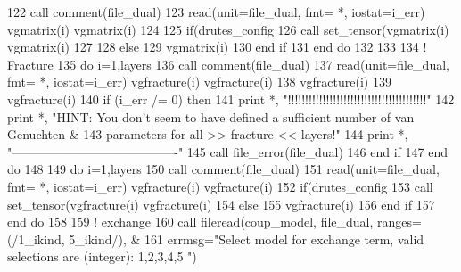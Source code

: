 \begin{DoxyCode}
122         \textcolor{keyword}{call }comment(file\_dual)
123         \textcolor{keyword}{read}(unit=file\_dual, fmt= *, iostat=i\_err) vgmatrix(i)%
      vgmatrix(i)%
124         
125         \textcolor{keywordflow}{if}(drutes_config%
126             \textcolor{keyword}{call }set_tensor(vgmatrix(i)%
      vgmatrix(i)%
127                  
128         \textcolor{keywordflow}{else}
129             vgmatrix(i)%
130 \textcolor{keywordflow}{        end if}    
131 \textcolor{keywordflow}{      end do}
132 
133 
134       \textcolor{comment}{! Fracture}
135       \textcolor{keywordflow}{do} i=1,layers
136         \textcolor{keyword}{call }comment(file\_dual)
137         \textcolor{keyword}{read}(unit=file\_dual, fmt= *, iostat=i\_err) vgfracture(i)%
      vgfracture(i)%
138                             vgfracture(i)%
139         vgfracture(i)%
140         \textcolor{keywordflow}{if} (i\_err /= 0) \textcolor{keywordflow}{then}
141           print *, \textcolor{stringliteral}{"!!!!!!!!!!!!!!!!!!!!!!!!!!!!!!!!!!!!!!!!"}
142           print *, \textcolor{stringliteral}{"HINT: You don't seem to have defined a sufficient number of van Genuchten &}
143 \textcolor{stringliteral}{}\textcolor{stringliteral}{           parameters for all >> fracture << layers!"}
144           print *, \textcolor{stringliteral}{"----------------------------------------"}
145           \textcolor{keyword}{call }file_error(file\_dual)
146 \textcolor{keywordflow}{        end if}
147 \textcolor{keywordflow}{      end do}
148       
149       \textcolor{keywordflow}{do} i=1,layers
150         \textcolor{keyword}{call }comment(file\_dual)
151         \textcolor{keyword}{read}(unit=file\_dual, fmt= *, iostat=i\_err) vgfracture(i)%
      vgfracture(i)%
152         \textcolor{keywordflow}{if}(drutes_config%
153             \textcolor{keyword}{call }set_tensor(vgfracture(i)%
      vgfracture(i)%
154         \textcolor{keywordflow}{else}
155             vgfracture(i)%
156 \textcolor{keywordflow}{        end if}    
157 \textcolor{keywordflow}{      end do}
158       
159       \textcolor{comment}{! exchange}
160       \textcolor{keyword}{call }fileread(coup_model, file\_dual, ranges=(/1\_ikind, 5\_ikind/), &
161                 errmsg=\textcolor{stringliteral}{"Select model for exchange term, valid selections are (integer): 1,2,3,4,5 "})

\end{DoxyCode}
